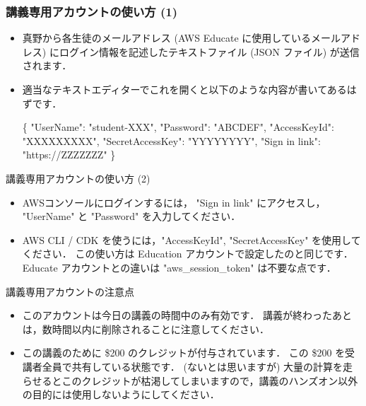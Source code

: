 \documentclass[unicode,11pt]{beamer}
\begin{document}
\begin{frame}[fragile]
\frametitle{講義専用アカウントの使い方 (1)}

\begin{itemize}
    \item 真野から各生徒のメールアドレス (AWS Educate に使用しているメールアドレス) にログイン情報を記述したテキストファイル (JSON ファイル) が送信されます．
    \item 適当なテキストエディターでこれを開くと以下のような内容が書いてあるはずです．
    \begin{semiverbatim}
    \{
        "UserName": "student-XXX",
        "Password": "ABCDEF",
        "AccessKeyId": "XXXXXXXXX",
        "SecretAccessKey": "YYYYYYYY",
        "Sign in link": "https://ZZZZZZZ"
    \}
    \end{semiverbatim}
\end{itemize}
    
\end{frame}

\begin{frame}{講義専用アカウントの使い方 (2)}

\begin{itemize}
    \item AWSコンソールにログインするには， "Sign in link" にアクセスし， "UserName" と "Password" を入力してください．
    \item AWS CLI / CDK を使うには，"AccessKeyId", "SecretAccessKey" を使用してください．
    この使い方は Education アカウントで設定したのと同じです．
    Educate アカウントとの違いは "aws\_session\_token" は不要な点です．
\end{itemize}
    
\end{frame}

\begin{frame}{講義専用アカウントの注意点}

\begin{itemize}
    \item このアカウントは今日の講義の時間中のみ有効です．
    講義が終わったあとは，数時間以内に削除されることに注意してください．
    \item この講義のために \$200 のクレジットが付与されています．
    この \$200 を受講者全員で共有している状態です．
    (ないとは思いますが) 大量の計算を走らせるとこのクレジットが枯渇してしまいますので，講義のハンズオン以外の目的には使用しないようにしてください．
\end{itemize}
    
\end{frame}
\end{document}

